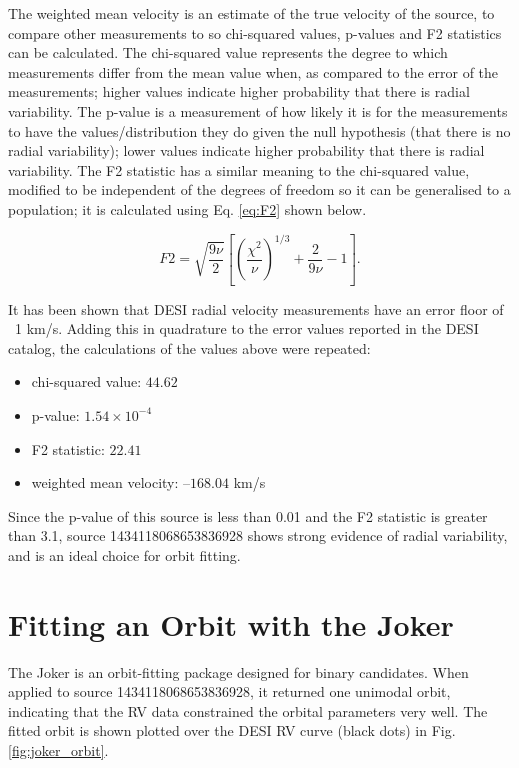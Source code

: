 \documentclass[12pt,a4paper]{article}
\begin{document}
The weighted mean velocity is an estimate of the true velocity of the source, to compare other measurements to so chi-squared values, p-values and F2 statistics can be calculated. The chi-squared value represents the degree to which measurements differ from the mean value when, as compared to the error of the measurements; higher values indicate higher probability that there is radial variability. The p-value is a measurement of how likely it is for the measurements to have the values/distribution they do given the null hypothesis (that there is no radial variability); lower values indicate higher probability that there is radial variability. The F2 statistic has a similar meaning to the chi-squared value, modified to be independent of the degrees of freedom so it can be generalised to a population; it is calculated using Eq. \ref{eq:F2} shown below.

\begin{equation}
F2 = \sqrt{\frac{9\nu}{2}} \left[ \left( \frac{\chi^2}{\nu} \right)^{1/3} + \frac{2}{9\nu} - 1 \right].
\label{eq:F2}
\end{equation}

It has been shown that DESI radial velocity measurements have an error floor of ~1 km/s. Adding this in quadrature to the error values reported in the DESI catalog, the calculations of the values above were repeated:
\begin{itemize}
  \item chi-squared value: $44.62$
  \item p-value: $1.54 \times 10^{-4}$
  \item F2 statistic: $22.41$
  \item weighted mean velocity: $–168.04$ km/s
\end{itemize}

Since the p-value of this source is less than 0.01 and the F2 statistic is greater than 3.1, source 1434118068653836928 shows strong evidence of radial variability, and is an ideal choice for orbit fitting.

\section{Fitting an Orbit with the Joker}
The Joker is an orbit-fitting package designed for binary candidates. When applied to source 1434118068653836928, it returned one unimodal orbit, indicating that the RV data constrained the orbital parameters very well. The fitted orbit is shown plotted over the DESI RV curve (black dots) in Fig. \ref{fig:joker_orbit}.
\end{document}
